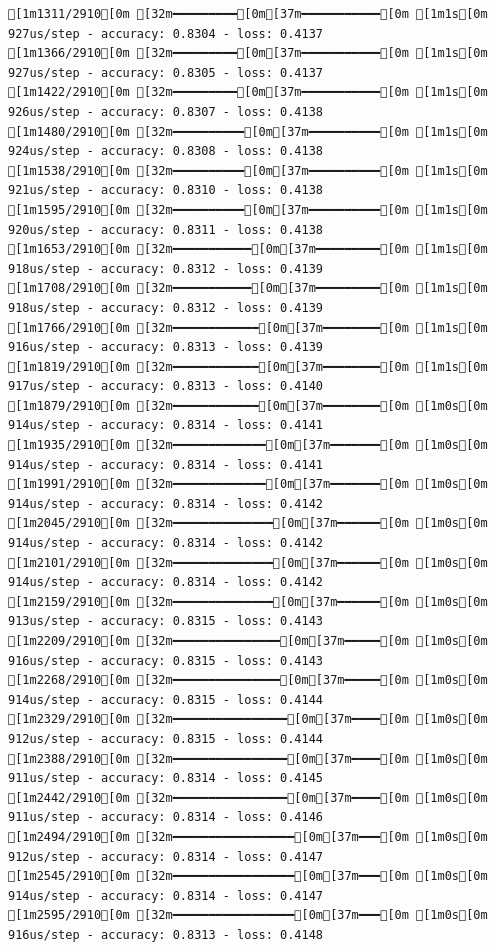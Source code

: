 \documentclass[
  letterpaper,
  DIV=11,
  numbers=noendperiod]{scrartcl}
\begin{document}
\begin{verbatim}
[1m1311/2910[0m [32m━━━━━━━━━[0m[37m━━━━━━━━━━━[0m [1m1s[0m 927us/step - accuracy: 0.8304 - loss: 0.4137
[1m1366/2910[0m [32m━━━━━━━━━[0m[37m━━━━━━━━━━━[0m [1m1s[0m 927us/step - accuracy: 0.8305 - loss: 0.4137
[1m1422/2910[0m [32m━━━━━━━━━[0m[37m━━━━━━━━━━━[0m [1m1s[0m 926us/step - accuracy: 0.8307 - loss: 0.4138
[1m1480/2910[0m [32m━━━━━━━━━━[0m[37m━━━━━━━━━━[0m [1m1s[0m 924us/step - accuracy: 0.8308 - loss: 0.4138
[1m1538/2910[0m [32m━━━━━━━━━━[0m[37m━━━━━━━━━━[0m [1m1s[0m 921us/step - accuracy: 0.8310 - loss: 0.4138
[1m1595/2910[0m [32m━━━━━━━━━━[0m[37m━━━━━━━━━━[0m [1m1s[0m 920us/step - accuracy: 0.8311 - loss: 0.4138
[1m1653/2910[0m [32m━━━━━━━━━━━[0m[37m━━━━━━━━━[0m [1m1s[0m 918us/step - accuracy: 0.8312 - loss: 0.4139
[1m1708/2910[0m [32m━━━━━━━━━━━[0m[37m━━━━━━━━━[0m [1m1s[0m 918us/step - accuracy: 0.8312 - loss: 0.4139
[1m1766/2910[0m [32m━━━━━━━━━━━━[0m[37m━━━━━━━━[0m [1m1s[0m 916us/step - accuracy: 0.8313 - loss: 0.4139
[1m1819/2910[0m [32m━━━━━━━━━━━━[0m[37m━━━━━━━━[0m [1m1s[0m 917us/step - accuracy: 0.8313 - loss: 0.4140
[1m1879/2910[0m [32m━━━━━━━━━━━━[0m[37m━━━━━━━━[0m [1m0s[0m 914us/step - accuracy: 0.8314 - loss: 0.4141
[1m1935/2910[0m [32m━━━━━━━━━━━━━[0m[37m━━━━━━━[0m [1m0s[0m 914us/step - accuracy: 0.8314 - loss: 0.4141
[1m1991/2910[0m [32m━━━━━━━━━━━━━[0m[37m━━━━━━━[0m [1m0s[0m 914us/step - accuracy: 0.8314 - loss: 0.4142
[1m2045/2910[0m [32m━━━━━━━━━━━━━━[0m[37m━━━━━━[0m [1m0s[0m 914us/step - accuracy: 0.8314 - loss: 0.4142
[1m2101/2910[0m [32m━━━━━━━━━━━━━━[0m[37m━━━━━━[0m [1m0s[0m 914us/step - accuracy: 0.8314 - loss: 0.4142
[1m2159/2910[0m [32m━━━━━━━━━━━━━━[0m[37m━━━━━━[0m [1m0s[0m 913us/step - accuracy: 0.8315 - loss: 0.4143
[1m2209/2910[0m [32m━━━━━━━━━━━━━━━[0m[37m━━━━━[0m [1m0s[0m 916us/step - accuracy: 0.8315 - loss: 0.4143
[1m2268/2910[0m [32m━━━━━━━━━━━━━━━[0m[37m━━━━━[0m [1m0s[0m 914us/step - accuracy: 0.8315 - loss: 0.4144
[1m2329/2910[0m [32m━━━━━━━━━━━━━━━━[0m[37m━━━━[0m [1m0s[0m 912us/step - accuracy: 0.8315 - loss: 0.4144
[1m2388/2910[0m [32m━━━━━━━━━━━━━━━━[0m[37m━━━━[0m [1m0s[0m 911us/step - accuracy: 0.8314 - loss: 0.4145
[1m2442/2910[0m [32m━━━━━━━━━━━━━━━━[0m[37m━━━━[0m [1m0s[0m 911us/step - accuracy: 0.8314 - loss: 0.4146
[1m2494/2910[0m [32m━━━━━━━━━━━━━━━━━[0m[37m━━━[0m [1m0s[0m 912us/step - accuracy: 0.8314 - loss: 0.4147
[1m2545/2910[0m [32m━━━━━━━━━━━━━━━━━[0m[37m━━━[0m [1m0s[0m 914us/step - accuracy: 0.8314 - loss: 0.4147
[1m2595/2910[0m [32m━━━━━━━━━━━━━━━━━[0m[37m━━━[0m [1m0s[0m 916us/step - accuracy: 0.8313 - loss: 0.4148

\end{verbatim}
\end{document}

